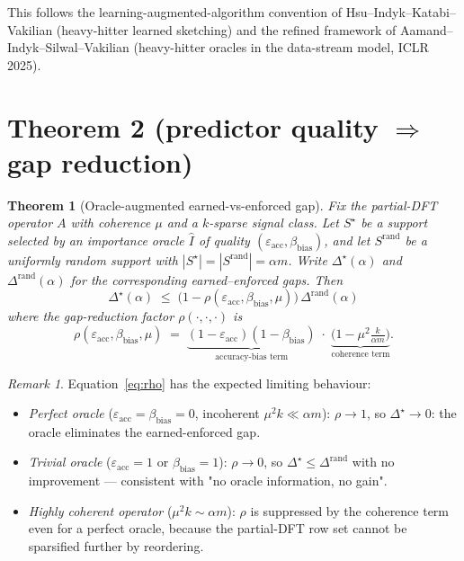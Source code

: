 \documentclass[11pt]{article}
\newtheorem{theorem}{Theorem}
\theoremstyle{remark}
\newtheorem*{remark}{Remark}
\begin{document}
This follows the learning-augmented-algorithm convention of
Hsu--Indyk--Katabi--Vakilian \cite{HsuIndykKatabiVakilian2019}
(heavy-hitter learned sketching) and the refined framework of
Aamand--Indyk--Silwal--Vakilian \cite{AamandIndykSilwalVakilian2025}
(heavy-hitter oracles in the data-stream model, ICLR 2025).

\section*{Theorem 2 (predictor quality $\Rightarrow$ gap reduction)}

\begin{theorem}[Oracle-augmented earned-vs-enforced gap]\label{thm:2}
Fix the partial-DFT operator $A$ with coherence $\mu$ and a $k$-sparse
signal class. Let $S^\star$ be a support selected by an importance
oracle $\hat{I}$ of quality
$(\varepsilon_{\mathrm{acc}}, \beta_{\mathrm{bias}})$, and let
$S^{\mathrm{rand}}$ be a uniformly random support with
$|S^\star| = |S^{\mathrm{rand}}| = \alpha m$. Write
$\Delta^\star(\alpha)$ and $\Delta^{\mathrm{rand}}(\alpha)$ for the
corresponding earned--enforced gaps. Then
\begin{equation}
    \boxed{\;\Delta^\star(\alpha) \;\leq\; \big(1 - \rho(\varepsilon_{\mathrm{acc}}, \beta_{\mathrm{bias}}, \mu)\big)\,\Delta^{\mathrm{rand}}(\alpha)\;}
    \label{eq:theorem2}
\end{equation}
where the \emph{gap-reduction factor} $\rho(\cdot,\cdot,\cdot)$ is
\begin{equation}
    \rho(\varepsilon_{\mathrm{acc}}, \beta_{\mathrm{bias}}, \mu) \;=\;
    \underbrace{(1-\varepsilon_{\mathrm{acc}})(1-\beta_{\mathrm{bias}})}_{\text{accuracy-bias term}}
    \;\cdot\;
    \underbrace{\big(1 - \mu^2\tfrac{k}{\alpha m}\big)}_{\text{coherence term}}.
    \label{eq:rho}
\end{equation}
\end{theorem}

\begin{remark}
Equation~\eqref{eq:rho} has the expected limiting behaviour:
\begin{itemize}
    \item \emph{Perfect oracle}
    ($\varepsilon_{\mathrm{acc}} = \beta_{\mathrm{bias}} = 0$,
    incoherent $\mu^2 k \ll \alpha m$): $\rho \to 1$, so
    $\Delta^\star \to 0$: the oracle eliminates the earned-enforced gap.
    \item \emph{Trivial oracle}
    ($\varepsilon_{\mathrm{acc}} = 1$ or $\beta_{\mathrm{bias}} = 1$):
    $\rho \to 0$, so $\Delta^\star \leq \Delta^{\mathrm{rand}}$ with no
    improvement --- consistent with "no oracle information, no gain".
    \item \emph{Highly coherent operator} ($\mu^2 k \sim \alpha m$):
    $\rho$ is suppressed by the coherence term even for a perfect
    oracle, because the partial-DFT row set cannot be sparsified further
    by reordering.
\end{itemize}
\end{remark}
\end{document}
